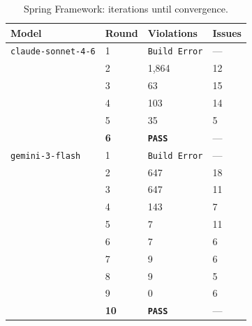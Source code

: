 \documentclass[sigconf,screen]{acmart}
\begin{document}
\begin{table}[t]
    \centering
    \small
    \caption{Spring Framework: iterations until convergence.}
    \label{tab:convergence-spring}
    \begin{tabular}{@{}p{}C{0.25\columnwidth}p{0.20\columnwidth}C{0.15\columnwidth}@{}}
        \toprule
        \textbf{Model} & \textbf{Round} & \textbf{Violations} & \textbf{Issues} \\
        \midrule
        \texttt{claude-sonnet-4-6} & 1 & \texttt{Build Error} & --- \\
                                                & 2 & 1,864 & 12 \\
                                                & 3 & 63 & 15 \\
                                                & 4 & 103 & 14 \\
                                                & 5 & 35 & 5 \\
                                                & \textbf{6} & \texttt{\textbf{PASS}} & --- \\
        \texttt{gemini-3-flash} & 1 & \texttt{Build Error} & --- \\
                                            & 2 & 647 & 18 \\
                                            & 3 & 647 & 11 \\
                                            & 4 & 143 & 7 \\
                                            & 5 & 7 & 11 \\
                                            & 6 & 7 & 6 \\
                                            & 7 & 9 & 6 \\
                                            & 8 & 9 & 5 \\
                                            & 9 & 0 & 6 \\
                                            & \textbf{10} & \texttt{\textbf{PASS}} & --- \\
        \bottomrule
    \end{tabular}
\end{table}
\end{document}
